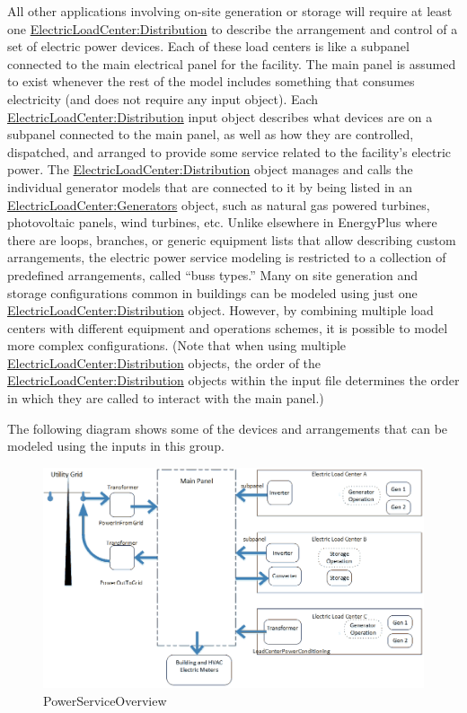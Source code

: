 All other applications involving on-site generation or storage will require at least one \hyperref[electricloadcenterdistribution]{ElectricLoadCenter:Distribution} to describe the arrangement and control of a set of electric power devices. Each of these load centers is like a subpanel connected to the main electrical panel for the facility. The main panel is assumed to exist whenever the rest of the model includes something that consumes electricity (and does not require any input object). Each \hyperref[electricloadcenterdistribution]{ElectricLoadCenter:Distribution} input object describes what devices are on a subpanel connected to the main panel, as well as how they are controlled, dispatched, and arranged to provide some service related to the facility's electric power. The \hyperref[electricloadcenterdistribution]{ElectricLoadCenter:Distribution} object manages and calls the individual generator models that are connected to it by being listed in an \hyperref[electricloadcentergenerators]{ElectricLoadCenter:Generators} object, such as natural gas powered turbines, photovoltaic panels, wind turbines, etc. Unlike elsewhere in EnergyPlus where there are loops, branches, or generic equipment lists that allow describing custom arrangements, the electric power service modeling is restricted to a collection of predefined arrangements, called ``buss types.'' Many on site generation and storage configurations common in buildings can be modeled using just one \hyperref[electricloadcenterdistribution]{ElectricLoadCenter:Distribution} object. However, by combining multiple load centers with different equipment and operations schemes, it is possible to model more complex configurations. (Note that when using multiple \hyperref[electricloadcenterdistribution]{ElectricLoadCenter:Distribution} objects, the order of the \hyperref[electricloadcenterdistribution]{ElectricLoadCenter:Distribution} objects within the input file determines the order in which they are called to interact with the main panel.)

The following diagram shows some of the devices and arrangements that can be modeled using the inputs in this group.

\begin{figure}[htbp]
\centering
\includegraphics{media/ElectPowerServiceOverview.png}
\caption{PowerServiceOverview}
\end{figure}


